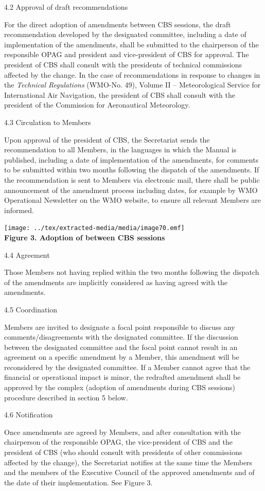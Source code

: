 4.2 Approval of draft recommendations

For the direct adoption of amendments between CBS sessions, the draft recommendation developed by the designated committee, including a date of implementation of the amendments, shall be submitted to the chairperson of the responsible OPAG and president and vice-president of CBS for approval. The president of CBS shall consult with the presidents of technical commissions affected by the change. In the case of recommendations in response to changes in the \emph{Technical Regulations} (WMO-No. 49), Volume II -- Meteorological Service for International Air Navigation, the president of CBS shall consult with the president of the Commission for Aeronautical Meteorology.

4.3 Circulation to Members

Upon approval of the president of CBS, the Secretariat sends the recommendation to all Members, in the languages in which the Manual is published, including a date of implementation of the amendments, for comments to be submitted within two months following the dispatch of the amendments. If the recommendation is sent to Members via electronic mail, there shall be public announcement of the amendment process including dates, for example by WMO Operational Newsletter on the WMO website, to ensure all relevant Members are informed.

\texttt{[image: ../tex/extracted-media/media/image70.emf]}\textbf{\\
Figure 3. Adoption of between CBS sessions}

4.4 Agreement

Those Members not having replied within the two months following the dispatch of the amendments are implicitly considered as having agreed with the amendments.

4.5 Coordination

Members are invited to designate a focal point responsible to discuss any comments/disagreements with the designated committee. If the discussion between the designated committee and the focal point cannot result in an agreement on a specific amendment by a Member, this amendment will be reconsidered by the designated committee. If a Member cannot agree that the financial or operational impact is minor, the redrafted amendment shall be approved by the complex (adoption of amendments during CBS sessions) procedure described in section 5 below.

4.6 Notification

Once amendments are agreed by Members, and after consultation with the chairperson of the responsible OPAG, the vice-president of CBS and the president of CBS (who should consult with presidents of other commissions affected by the change), the Secretariat notifies at the same time the Members and the members of the Executive Council of the approved amendments and of the date of their implementation. See Figure 3.

